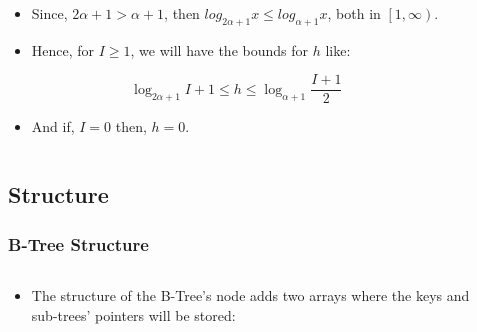 \documentclass{beamer}
\begin{document}
\begin{frame}
    \begin{columns}
        \begin{column}{\textlecolumn}
            \begin{block}{}
                \begin{itemize}
                    \item Since, \(2\alpha + 1 > \alpha + 1\), then \(log_{2\alpha + 1} x \leq log_{\alpha + 1}x\), both in \(\left[1, \infty\right)\).
                    \item Hence, for \(I \geq 1\), we will have the bounds for \(h\) like:
                \end{itemize}
                \[
                    \log_{2\alpha + 1} I + 1 
                    \leq
                    h
                    \leq
                    \log_{\alpha + 1} \frac{I + 1}{2}
                \]
                \begin{itemize}
                    \item And if, \(I = 0\) then, \(h = 0\).
                \end{itemize}
            \end{block}
        \end{column}
        \begin{column}{\textricolumn}
        \end{column}
    \end{columns}
\end{frame}
\begin{frame}
    \subsection{Structure}
    \frametitle{B-Tree Structure}
    \begin{columns}
        \begin{column}{\textlecolumn}
            \begin{block}{}
                \begin{itemize}
                    \item The structure of the B-Tree's node adds two arrays where the keys and sub-trees' pointers will be stored:
                \end{itemize}
            \end{block}
            \begin{block}
                \btreeStructure
            \end{block}
        \end{column}
        \begin{column}{\textricolumn}
        \end{column}
    \end{columns}
\end{frame}
\end{document}
